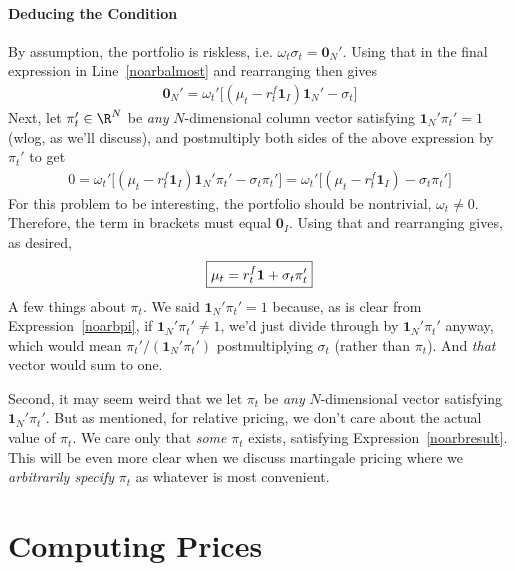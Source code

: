 \documentclass[12pt]{article}
\theoremstyle{plain}
\theoremstyle{definition}
\theoremstyle{remark}
\renewcommand{\bso}{\boldsymbol{0}}
\begin{document}
\paragraph{Deducing the Condition}
By assumption, the portfolio is riskless, i.e.
$\omega_t\sigma_t=\bso_N'$.
Using that in the final expression in Line~\ref{noarbalmost} and
rearranging then gives
\begin{align*}
  \bso_N'
  =
  \omega_t'
  \big[
  (\mu_t-r_t^f\mathbf{1}_I)\mathbf{1}_N'
  -\sigma_t
  \big]
\end{align*}
Next, let $\pi_t'\in \R^N$ be \emph{any} $N$-dimensional column vector
satisfying $\mathbf{1}_N'\pi_t'=1$ (wlog, as we'll discuss), and
postmultiply both sides of the above expression by $\pi_t'$ to get
\begin{align}
  0
  =
  \omega_t'
  \big[
  (\mu_t-r_t^f\mathbf{1}_I)\mathbf{1}_N'\pi_t'
  -\sigma_t\pi_t'
  \big]
  =
  \omega_t'
  \big[
  (\mu_t-r_t^f\mathbf{1}_I)
  -\sigma_t\pi_t'
  \big]
  \label{noarbpi}
\end{align}
For this problem to be interesting, the portfolio should be nontrivial,
$\omega_t\neq0$. Therefore, the term in brackets must equal $\bso_I$.
Using that and rearranging gives, as desired,
\begin{align}
  \boxed{%
  \mu_t
  =
  r_t^f\mathbf{1}+\sigma_t\pi_t'
  }
  \label{noarbresult}
\end{align}
A few things about $\pi_t$.
We said $\mathbf{1}_N'\pi_t'=1$ because,
as is clear from Expression~\ref{noarbpi}, if
$\mathbf{1}_N'\pi_t'\neq 1$, we'd just divide through by
$\mathbf{1}_N'\pi_t'$ anyway, which would mean
$\pi_t'/(\mathbf{1}_N'\pi_t')$ postmultiplying $\sigma_t$ (rather than
$\pi_t$).
And \emph{that} vector would sum to one.

Second, it may seem weird that we let $\pi_t$ be \emph{any}
$N$-dimensional vector satisfying $\mathbf{1}_N'\pi_t'$.
But as mentioned, for relative pricing, we don't care about the actual
value of $\pi_t$. We care only that \emph{some} $\pi_t$ exists,
satisfying Expression~\ref{noarbresult}.
This will be even more clear when we discuss martingale pricing where we
\emph{arbitrarily specify} $\pi_t$ as whatever is most convenient.


\clearpage
\section{Computing Prices}
\end{document}
